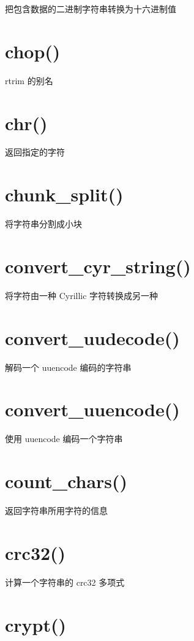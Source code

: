 把包含数据的二进制字符串转换为十六进制值

\section{chop()}

rtrim 的别名

\section{chr()}

返回指定的字符

\section{chunk\_split()}

将字符串分割成小块

\section{convert\_cyr\_string()}

将字符由一种 Cyrillic 字符转换成另一种


\section{convert\_uudecode()}

解码一个 uuencode 编码的字符串

\section{convert\_uuencode()}

使用 uuencode 编码一个字符串

\section{count\_chars()}

返回字符串所用字符的信息

\section{crc32()}

计算一个字符串的 crc32 多项式

\section{crypt()}

